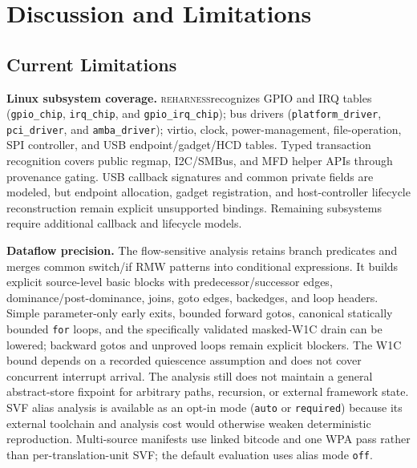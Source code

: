 \documentclass[sigplan, screen, review, anonymous]{acmart}
\newcommand{\reharness}{\textsc{reharness}}
\begin{document}
\section{Discussion and Limitations}
\label{sec:discussion}

\subsection{Current Limitations}

\textbf{Linux subsystem coverage.} \reharness recognizes GPIO and IRQ tables (\texttt{gpio\_chip}, \texttt{irq\_chip}, and \texttt{gpio\_irq\_chip}); bus drivers (\texttt{platform\_driver}, \texttt{pci\_driver}, and \texttt{amba\_driver}); virtio, clock, power-management, file-operation, SPI controller, and USB endpoint/gadget/HCD tables. Typed transaction recognition covers public regmap, I2C/SMBus, and MFD helper APIs through provenance gating. USB callback signatures and common private fields are modeled, but endpoint allocation, gadget registration, and host-controller lifecycle reconstruction remain explicit unsupported bindings. Remaining subsystems require additional callback and lifecycle models.

\textbf{Dataflow precision.} The flow-sensitive analysis retains branch predicates and merges common switch/if RMW patterns into conditional expressions. It builds explicit source-level basic blocks with predecessor/successor edges, dominance/post-dominance, joins, goto edges, backedges, and loop headers. Simple parameter-only early exits, bounded forward gotos, canonical statically bounded \texttt{for} loops, and the specifically validated masked-W1C drain can be lowered; backward gotos and unproved loops remain explicit blockers. The W1C bound depends on a recorded quiescence assumption and does not cover concurrent interrupt arrival. The analysis still does not maintain a general abstract-store fixpoint for arbitrary paths, recursion, or external framework state. SVF alias analysis is available as an opt-in mode (\texttt{auto} or \texttt{required}) because its external toolchain and analysis cost would otherwise weaken deterministic reproduction. Multi-source manifests use linked bitcode and one WPA pass rather than per-translation-unit SVF; the default evaluation uses alias mode \texttt{off}.
\end{document}
